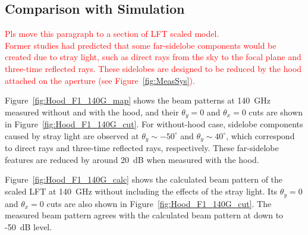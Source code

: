 \documentclass[journal]{IEEEtran}
\newcommand{\red}[1]{\textcolor{red}{#1}}
\begin{document}
\subsection{Comparison with Simulation}
%
\red{Pls move this paragraph to a section of LFT scaled model. \\
Former studies \cite{Kashima2018, Imada2018} had predicted that some far-sidelobe components would be created due to stray light, such as direct rays from the sky to the focal plane and three-time reflected rays. These sidelobes are designed to be reduced by the hood attached on the aperture (see Figure~\ref{fig:MeasSys}).}
\par
Figure~\ref{fig:Hood_F1_140G_map} shows the beam patterns at 140~GHz measured without and with the hood, and their $\theta_y = 0$ and $\theta_x = 0$ cuts are shown in Figure~\ref{fig:Hood_F1_140G_cut}. For without-hood case, sidelobe components caused by stray light are observed at $\theta_y \sim -50^\circ$ and $\theta_y \sim 40^\circ$, which correspond to direct rays and three-time reflected rays, respectively. These far-sidelobe features are reduced by around 20~dB when measured with the hood.
\par
Figure~\ref{fig:Hood_F1_140G_calc} shows the calculated beam pattern of the scaled LFT at 140~GHz without including the effects of the stray light. Its $\theta_y = 0$ and $\theta_x = 0$ cuts are also shown in Figure~\ref{fig:Hood_F1_140G_cut}. The measured beam pattern agrees with the calculated beam pattern at down to -50~dB level. 
%
\end{document}
